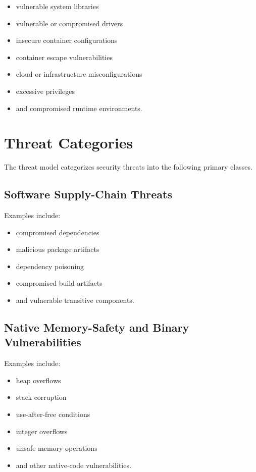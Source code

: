 \documentclass[
  12pt,
  letterpaper,
  oneside]{report}
\providecommand{\tightlist}{%
  \setlength{\itemsep}{0pt}\setlength{\parskip}{0pt}}
\begin{document}
\begin{itemize}
\tightlist
\item
  vulnerable system libraries
\item
  vulnerable or compromised drivers
\item
  insecure container configurations
\item
  container escape vulnerabilities
\item
  cloud or infrastructure misconfigurations
\item
  excessive privileges
\item
  and compromised runtime environments.
\end{itemize}

\section{Threat Categories}\label{65-threat-categories}

The threat model categorizes security threats into the following primary
classes.

\subsection{Software Supply-Chain Threats}\label{651-software-supply-chain-threats}

Examples include:

\begin{itemize}
\tightlist
\item
  compromised dependencies
\item
  malicious package artifacts
\item
  dependency poisoning
\item
  compromised build artifacts
\item
  and vulnerable transitive components.
\end{itemize}

\subsection{Native Memory-Safety and Binary Vulnerabilities}\label{652-native-memory-safety-and-binary-vulnerabilities}

Examples include:

\begin{itemize}
\tightlist
\item
  heap overflows
\item
  stack corruption
\item
  use-after-free conditions
\item
  integer overflows
\item
  unsafe memory operations
\item
  and other native-code vulnerabilities.
\end{itemize}
\end{document}
